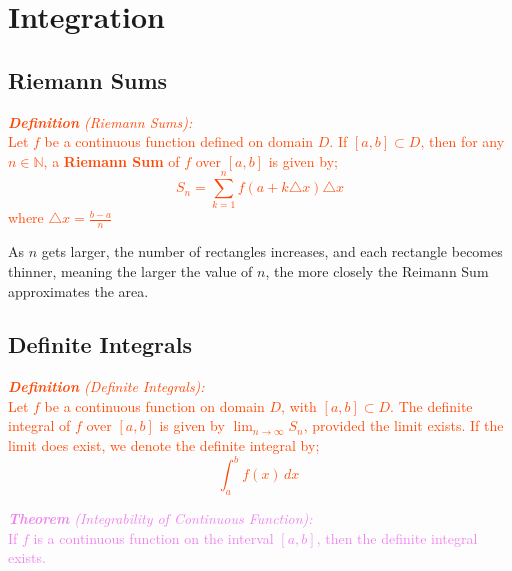 \documentclass{report}
\newenvironment{definition}[1][OrangeRed]
  {\begin{tcolorbox}[colframe=#1,colback=white]}
  {\end{tcolorbox}}
\newenvironment{theorem}[1][Violet]
  {\begin{tcolorbox}[colframe=#1,colback=white]}
  {\end{tcolorbox}}
\begin{document}
\chapter{Integration}
\section{Riemann Sums}

\begin{definition}
    \textcolor{OrangeRed}{\textit{\textbf{Definition} (Riemann Sums):}\\
    Let $f$ be a continuous function defined on domain $D$. If $[a,b] \subset D$, then for any $n \in \mathbb{N}$, a \textbf{Riemann Sum} of $f$ over $[a,b]$ is given by;
    \begin{equation}
        S_n = \sum_{k=1}^n f(a + k \triangle x) \triangle x
    \end{equation}
    where $\triangle x = \frac{b-a}{n}$}
\end{definition}
As $n$ gets larger, the number of rectangles increases, and each rectangle becomes thinner, meaning the larger the value of $n$, the more closely the Reimann Sum approximates the area.

\section{Definite Integrals}

\begin{definition}
    \textcolor{OrangeRed}{\textit{\textbf{Definition} (Definite Integrals):}\\
    Let $f$ be a continuous function on domain $D$, with $[a,b] \subset D$. The definite integral of $f$ over $[a,b]$ is given by $\lim_{n \longrightarrow \infty} S_n$, provided the limit exists. If the limit does exist, we denote the definite integral by;
    \begin{equation}
        \int_a^b f(x) \,dx\
    \end{equation}}
\end{definition}

\begin{theorem}
    \textcolor{Violet}{\textit{\textbf{Theorem} (Integrability of Continuous Function):}\\
    If $f$ is a continuous function on the interval $[a,b]$, then the definite integral exists.}
\end{theorem}
\end{document}
